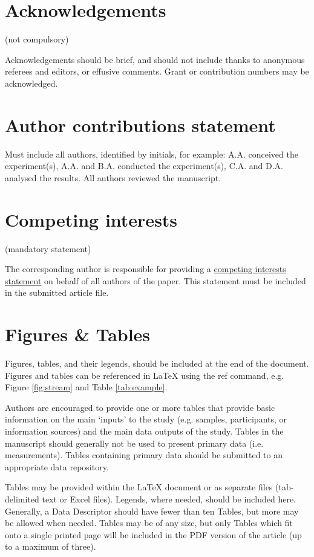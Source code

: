 \documentclass[fleqn,10pt]{wlscirep}
\begin{document}
\section*{Acknowledgements} (not compulsory)

Acknowledgements should be brief, and should not include thanks to anonymous referees
and editors, or effusive comments. Grant or contribution numbers may be acknowledged.

\section*{Author contributions statement}

Must include all authors, identified by initials, for example: A.A. conceived the
experiment(s), A.A. and B.A. conducted the experiment(s), C.A. and D.A. analysed the
results. All authors reviewed the manuscript.

\section*{Competing interests} (mandatory statement)

The corresponding author is responsible for providing a
\href{https://www.nature.com/sdata/policies/editorial-and-publishing-policies#competing}{competing
interests statement} on behalf of all authors of the paper. This statement must be
included in the submitted article file.

\section*{Figures \& Tables}

Figures, tables, and their legends, should be included at the end of the document.
Figures and tables can be referenced in \LaTeX{} using the ref command, e.g. Figure
\ref{fig:stream} and Table \ref{tab:example}.

Authors are encouraged to provide one or more tables that provide basic information on
the main ‘inputs’ to the study (e.g. samples, participants, or information sources) and
the main data outputs of the study. Tables in the manuscript should generally not be
used to present primary data (i.e. measurements). Tables containing primary data should
be submitted to an appropriate data repository.

Tables may be provided within the \LaTeX{} document or as separate files (tab-delimited
text or Excel files). Legends, where needed, should be included here. Generally, a Data
Descriptor should have fewer than ten Tables, but more may be allowed when needed.
Tables may be of any size, but only Tables which fit onto a single printed page will be
included in the PDF version of the article (up to a maximum of three).
\end{document}
